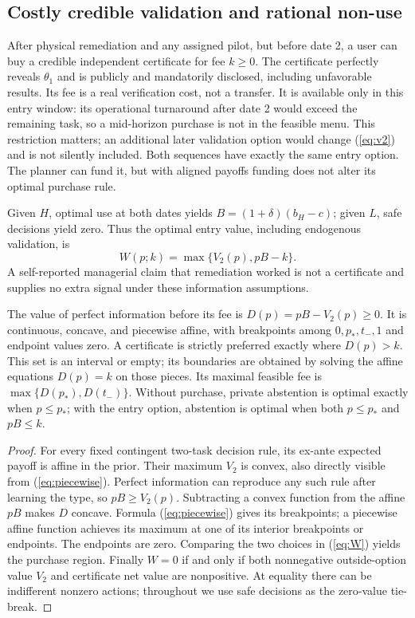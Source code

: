 \subsection{Costly credible validation and rational non-use}\label{sec:certificate}
After physical remediation and any assigned pilot, but before date 2, a user can buy a credible independent certificate for fee $k\geq0$. The certificate perfectly reveals $\theta_1$ and is publicly and mandatorily disclosed, including unfavorable results. Its fee is a real verification cost, not a transfer. It is available only in this entry window: its operational turnaround after date 2 would exceed the remaining task, so a mid-horizon purchase is not in the feasible menu. This restriction matters; an additional later validation option would change (\ref{eq:v2}) and is not silently included. Both sequences have exactly the same entry option. The planner can fund it, but with aligned payoffs funding does not alter its optimal purchase rule.

Given $H$, optimal use at both dates yields $B=(1+\delta)(b_H-c)$; given $L$, safe decisions yield zero. Thus the optimal entry value, including endogenous validation, is
\begin{equation}
 W(p;k)=\max\{V_2(p),pB-k\}.\label{eq:W}
\end{equation}
A self-reported managerial claim that remediation worked is not a certificate and supplies no extra signal under these information assumptions.

\begin{proposition}\label{prop:validate}
The value of perfect information before its fee is $D(p)=pB-V_2(p)\geq0$. It is continuous, concave, and piecewise affine, with breakpoints among $0,p_*,t_-,1$ and endpoint values zero. A certificate is strictly preferred exactly where $D(p)>k$. This set is an interval or empty; its boundaries are obtained by solving the affine equations $D(p)=k$ on those pieces. Its maximal feasible fee is $\max\{D(p_*),D(t_-)\}$. Without purchase, private abstention is optimal exactly when $p\leq p_*$; with the entry option, abstention is optimal when both $p\leq p_*$ and $pB\leq k$.
\end{proposition}
\begin{proof}
For every fixed contingent two-task decision rule, its ex-ante expected payoff is affine in the prior. Their maximum $V_2$ is convex, also directly visible from (\ref{eq:piecewise}). Perfect information can reproduce any such rule after learning the type, so $pB\geq V_2(p)$. Subtracting a convex function from the affine $pB$ makes $D$ concave. Formula (\ref{eq:piecewise}) gives its breakpoints; a piecewise affine function achieves its maximum at one of its interior breakpoints or endpoints. The endpoints are zero. Comparing the two choices in (\ref{eq:W}) yields the purchase region. Finally $W=0$ if and only if both nonnegative outside-option value $V_2$ and certificate net value are nonpositive. At equality there can be indifferent nonzero actions; throughout we use safe decisions as the zero-value tie-break.
\end{proof}

